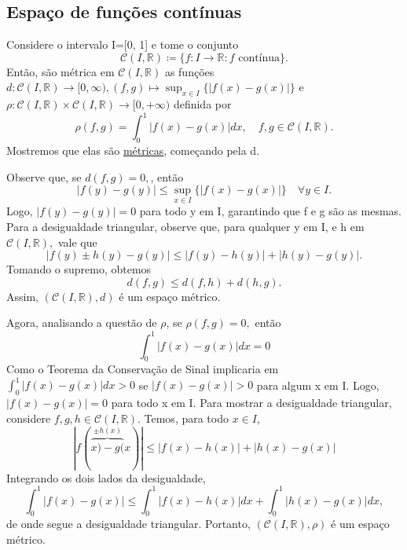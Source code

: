 \documentclass{article}
\begin{document}
\subsection{Espaço de funções contínuas}
   Considere o intervalo I=[0, 1] e tome o conjunto 
     \[
       \mathcal{C}(I, \mathbb{R})\coloneqq \{f:I\rightarrow \mathbb{R}: f \text{ contínua}\}.
     \]
     Então, são métrica em \(\mathcal{C}(I, \mathbb{R})\) as funções \(d:\mathcal{C}(I, \mathbb{R})\rightarrow [0, \infty), (f, g)\mapsto \sup_{x\in I}\{|f(x)-g(x)|\}\)
e \(\rho :\mathcal{C}(I, \mathbb{R})\times \mathcal{C}(I, \mathbb{R})\rightarrow [0, +\infty)\) definida por 
  \[
    \rho(f, g) = \int_{0}^{1}|f(x)-g(x)|dx,\quad f, g\in \mathcal{C}(I, \mathbb{R}).
  \]
    Mostremos que elas são \hyperlink{def_metric}{métricas}, começando pela d.

    Observe que, se \(d(f, g) = 0,\), então 
      \[
        |f(y)-g(y)|\leq \sup_{x\in I}\{|f(x)-g(x)|\}\quad \forall y\in I.
      \]
    Logo, \(|f(y) - g(y)| = 0\) para todo y em I, garantindo que f e g são as mesmas.
    Para a desigualdade triangular, observe que, para qualquer y em I, e h em \(\mathcal{C}(I, \mathbb{R}),\) vale que
    \[
      |f(y)\pm h(y) - g(y)|\leq |f(y) - h(y)| + |h(y) - g(y)|.
    \]
    Tomando o supremo, obtemos 
      \[
        d(f, g)\leq d(f, h) + d(h, g).
      \]
    Assim, \((\mathcal{C}(I, \mathbb{R}), d)\) é um espaço métrico.

    Agora, analisando a questão de \(\rho\), se \(\rho (f, g) = 0,\) então 
      \[
        \int_{0}^{1}|f(x)-g(x)|dx = 0
      \]
    Como o Teorema da Conservação de Sinal implicaria em \(\int_{0}^{1}|f(x)-g(x)|dx > 0\) se \(|f(x)-g(x)| > 0\) para algum x em I.
    Logo, \(|f(x)-g(x)|=0\) para todo x em I. Para mostrar a desigualdade triangular, considere \(f, g, h\in \mathcal{C}(I, \mathbb{R}).\)
    Temos, para todo \(x\in I\), 
      \[
        |f(\overbrace{x)-g(}^{\pm h(x)}x)|\leq |f(x) - h(x)| + |h(x) - g(x)|
      \]
    Integrando os dois lados da desigualdade, 
      \[
        \int_{0}^{1}|f(x)-g(x)|\leq \int_{0}^{1}|f(x) - h(x)|dx + \int_{0}^{1}|h(x) - g(x)|dx,
      \]
      de onde segue a desigualdade triangular. Portanto, \((\mathcal{C}(I, \mathbb{R}), \rho)\) é um espaço métrico.
\end{document}
